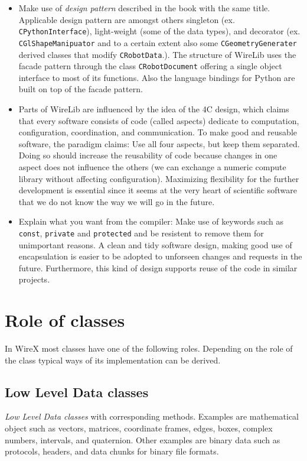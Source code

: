 \documentclass[11pt,a4paper,onepage,openany]{book}
\begin{document}
\begin{itemize}
\item Make use of \emph{design pattern} described in the book with the same title.
    Applicable design pattern are amongst others singleton (ex.
    \texttt{CPythonInterface}), light-weight (some of the data types), and
    decorator (ex. \texttt{CGlShapeManipuator} and to a certain extent also
    some \texttt{CGeometryGenerater} derived classes that modify
    \texttt{CRobotData}.). The structure of WireLib uses the facade pattern
    through the class \texttt{CRobotDocument} offering a single object interface
    to most of its functions. Also the language bindings for Python are built on
    top of the facade pattern.

\item Parts of WireLib are influenced by the idea of the 4C design, which
    claims that every software consists of code (called aspects) dedicate to
    computation, configuration, coordination, and communication. To make good
    and reusable software, the paradigm claims: Use all four aspects, but
    keep them separated. Doing so should increase the reusability of code
    because changes in one aspect does not influence the others (we can
    exchange a numeric compute library without affecting configuration).
    Maximizing flexibility for the further development is essential since it
    seems at the very heart of scientific software that we do not know the
    way we will go in the future.

\item Explain what you want from the compiler: Make use of keywords such as
    \texttt{const}, \texttt{private} and \texttt{protected} and be resistent
    to remove them for unimportant reasons. A clean and tidy software design,
    making good use of encapsulation is easier to be adopted to unforseen
    changes and requests in the future. Furthermore, this kind of design
    supports reuse of the code in similar projects.
\end{itemize}

\section{Role of classes}
In WireX most classes have one of the following roles. Depending on the role of
the class typical ways of its implementation can be derived.

\subsection{Low Level Data classes}
\emph{Low Level Data classes} with corresponding methods. Examples are
mathematical object such as vectors, matrices, coordinate frames, edges, boxes,
complex numbers, intervals, and quaternion. Other examples are binary data such
as protocols, headers, and data chunks for binary file formats.
\end{document}
